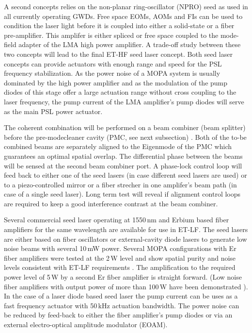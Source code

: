 A second concepts relies on the non-planar ring-oscillator (NPRO) seed as used
in all currently operating GWDs. Free space EOMs, AOMs and FIs can be used to
condition the laser light before it is coupled into either a solid-state or a
fiber pre-amplifier. This amplifer is either spliced or free space coupled to
the mode-field adapter of the LMA high power amplifier. A trade-off study
between these two concepts will lead to the final ET-HF seed laser concept. Both
seed laser concepts can provide  actuators with enough range and speed for the
PSL frequency stabilization. As the power noise of a MOPA system is usually
dominated by the high power amplifier and as the modulation of the pump diodes
of this stage offer a large actuation range without cross coupling to the laser
frequency, the pump current of the LMA amplifier's pump diodes will serve as the
main PSL power actuator.

The coherent combination will be performed on a beam combiner (beam splitter)
before the pre-modecleaner cavity (PMC, see next subsection) . Both of the to-be
combined beams are separately aligned to the Eigenmode of the PMC which
guarantees an optimal spatial overlap. The differential phase between the beams
will be sensed at the second beam combiner port. A phase-lock control loop will
feed back to either one of the seed lasers (in case different seed lasers are
used) or to a piezo-controlled mirror or a fiber strecher in one amplifer's beam
path (in case of a single seed laser). Long term test will reveal if alignment
control loops are required to keep a good interference contrast at the beam
combiner.

Several commercial seed laser operating at 1550\,nm and Erbium based fiber
amplifiers for the same wavelength are available for use in ET-LF. The seed
lasers are either based on fiber oscillators or external-cavity diode lasers to
generate low noise beams with several 10\,mW power. Several MOPA configurations
with Er fiber amplifiers were tested at the 2\,W level and show spatial purity
and noise levels consistent with ET-LF requirements \cite{Meylahn2019}. The
amplification to the required power level of 5\,W by a second Er fiber amplifier
is straight forward. (Low noise fiber amplifiers with output power of more than
100\,W have been demonstrated \cite{deVarona2017}). In the case of a laser diode
based seed laser the pump current can be uses as a fast frequency actuator with
50\,kHz actuation bandwidth. The power noise can be reduced by feed-back to
either the fiber amplifier's pump diodes or via an external electro-optical
amplitude modulator (EOAM).

